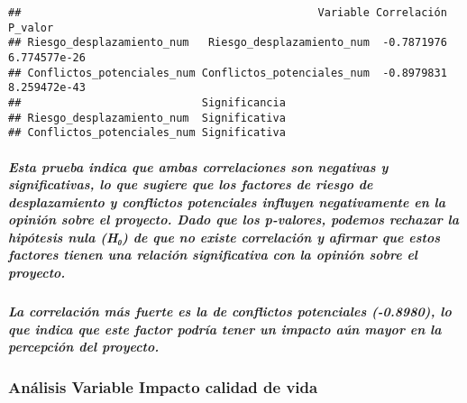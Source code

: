 \documentclass[
]{article}
\begin{document}
\begin{verbatim}
##                                              Variable Correlación      P_valor
## Riesgo_desplazamiento_num   Riesgo_desplazamiento_num  -0.7871976 6.774577e-26
## Conflictos_potenciales_num Conflictos_potenciales_num  -0.8979831 8.259472e-43
##                            Significancia
## Riesgo_desplazamiento_num  Significativa
## Conflictos_potenciales_num Significativa
\end{verbatim}

\subparagraph{\texorpdfstring{\emph{Esta prueba indica que ambas
correlaciones son negativas y significativas, lo que sugiere que los
factores de riesgo de desplazamiento y conflictos potenciales influyen
negativamente en la opinión sobre el proyecto. Dado que los p-valores,
podemos rechazar la hipótesis nula (H₀) de que no existe correlación y
afirmar que estos factores tienen una relación significativa con la
opinión sobre el
proyecto.}}{Esta prueba indica que ambas correlaciones son negativas y significativas, lo que sugiere que los factores de riesgo de desplazamiento y conflictos potenciales influyen negativamente en la opinión sobre el proyecto. Dado que los p-valores, podemos rechazar la hipótesis nula (H₀) de que no existe correlación y afirmar que estos factores tienen una relación significativa con la opinión sobre el proyecto.}}\label{esta-prueba-indica-que-ambas-correlaciones-son-negativas-y-significativas-lo-que-sugiere-que-los-factores-de-riesgo-de-desplazamiento-y-conflictos-potenciales-influyen-negativamente-en-la-opiniuxf3n-sobre-el-proyecto.-dado-que-los-p-valores-podemos-rechazar-la-hipuxf3tesis-nula-hux2080-de-que-no-existe-correlaciuxf3n-y-afirmar-que-estos-factores-tienen-una-relaciuxf3n-significativa-con-la-opiniuxf3n-sobre-el-proyecto.}

\subparagraph{\texorpdfstring{\emph{La correlación más fuerte es la de
conflictos potenciales (-0.8980), lo que indica que este factor podría
tener un impacto aún mayor en la percepción del
proyecto.}}{La correlación más fuerte es la de conflictos potenciales (-0.8980), lo que indica que este factor podría tener un impacto aún mayor en la percepción del proyecto.}}\label{la-correlaciuxf3n-muxe1s-fuerte-es-la-de-conflictos-potenciales--0.8980-lo-que-indica-que-este-factor-podruxeda-tener-un-impacto-auxfan-mayor-en-la-percepciuxf3n-del-proyecto.}

\subsubsection{\texorpdfstring{\textbf{Análisis Variable Impacto calidad
de
vida}}{Análisis Variable Impacto calidad de vida}}\label{anuxe1lisis-variable-impacto-calidad-de-vida}
\end{document}
